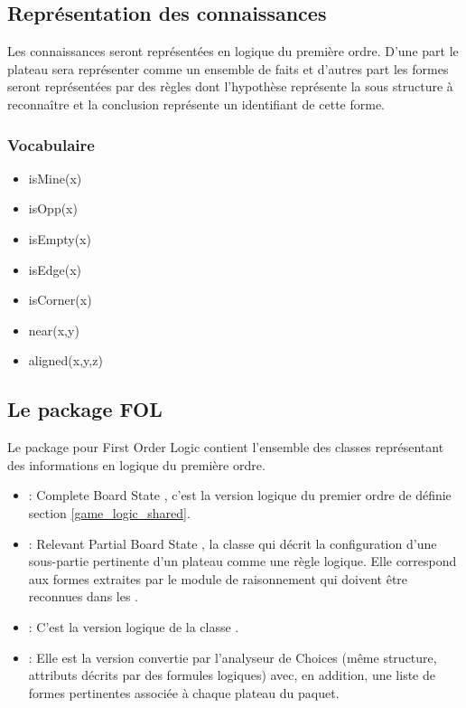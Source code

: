 \subsection{Représentation des connaissances}
\label{subsection_representation_co}
	Les connaissances seront représentées en logique du première ordre. D'une part le plateau sera représenter comme un ensemble de faits et d'autres part les \og formes \fg{} seront représentées par des règles dont l'hypothèse représente la sous structure à reconnaître et la conclusion représente un identifiant de cette forme.
	
	\subsubsection{Vocabulaire} 
	\begin{itemize}
		\item isMine(x)
  	\item isOpp(x)
  	\item isEmpty(x)
  	\item isEdge(x)
  	\item isCorner(x)
  	\item near(x,y)
  	\item aligned(x,y,z)
	\end{itemize}

\label{specs_voc_fol}

\subsection{Le package FOL}
\label{subsection_fol}

Le package  pour \og First Order Logic \fg{} contient l'ensemble des classes représentant des informations en logique du première ordre.

\begin{itemize}
  \item \textbf{} : \og Complete Board State \fg{}, c'est la version logique du premier ordre de  définie section \vref{game_logic_shared}.
  
  \item \textbf{} : \og Relevant Partial Board State \fg{}, la classe qui décrit la configuration d'une sous-partie pertinente d'un plateau comme une règle logique. Elle correspond aux \og formes \fg{} extraites par le module de raisonnement qui doivent être reconnues dans les .
  
   \item \textbf{} : C'est la version logique de la classe .
   
   \item \textbf{} : Elle est la version convertie par l'analyseur de Choices (même structure, attributs décrits par des formules logiques) avec, en addition, une liste de formes pertinentes associée à chaque plateau du paquet.
\end{itemize}


